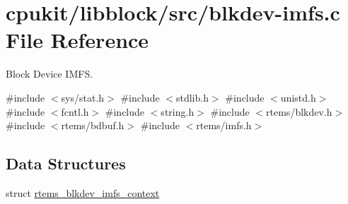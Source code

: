 \hypertarget{blkdev-imfs_8c}{}\section{cpukit/libblock/src/blkdev-\/imfs.c File Reference}
\label{blkdev-imfs_8c}


Block Device I\+M\+FS.  


{\ttfamily \#include $<$sys/stat.\+h$>$}\newline
{\ttfamily \#include $<$stdlib.\+h$>$}\newline
{\ttfamily \#include $<$unistd.\+h$>$}\newline
{\ttfamily \#include $<$fcntl.\+h$>$}\newline
{\ttfamily \#include $<$string.\+h$>$}\newline
{\ttfamily \#include $<$rtems/blkdev.\+h$>$}\newline
{\ttfamily \#include $<$rtems/bdbuf.\+h$>$}\newline
{\ttfamily \#include $<$rtems/imfs.\+h$>$}\newline
\subsection*{Data Structures}
\begin{DoxyCompactItemize}
\item 
struct \mbox{\hyperlink{structrtems__blkdev__imfs__context}{rtems\+\_\+blkdev\+\_\+imfs\+\_\+context}}
\end{DoxyCompactItemize}
